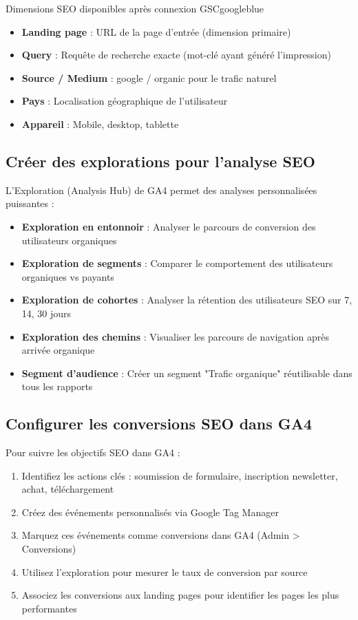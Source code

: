 \documentclass[12pt,a4paper,twoside]{report}
\begin{document}
\begin{mybox}{Dimensions SEO disponibles après connexion GSC}{googleblue}
\begin{itemize}
    \item \textbf{Landing page} : URL de la page d'entrée (dimension primaire)
    \item \textbf{Query} : Requête de recherche exacte (mot-clé ayant généré l'impression)
    \item \textbf{Source / Medium} : google / organic pour le trafic naturel
    \item \textbf{Pays} : Localisation géographique de l'utilisateur
    \item \textbf{Appareil} : Mobile, desktop, tablette
\end{itemize}
\end{mybox}

\subsection{Créer des explorations pour l'analyse SEO}

L'Exploration (Analysis Hub) de GA4 permet des analyses personnalisées puissantes :

\begin{itemize}
    \item \textbf{Exploration en entonnoir} : Analyser le parcours de conversion des utilisateurs organiques
    \item \textbf{Exploration de segments} : Comparer le comportement des utilisateurs organiques vs payants
    \item \textbf{Exploration de cohortes} : Analyser la rétention des utilisateurs SEO sur 7, 14, 30 jours
    \item \textbf{Exploration des chemins} : Visualiser les parcours de navigation après arrivée organique
    \item \textbf{Segment d'audience} : Créer un segment "Trafic organique" réutilisable dans tous les rapports
\end{itemize}

\subsection{Configurer les conversions SEO dans GA4}

Pour suivre les objectifs SEO dans GA4 :
\begin{enumerate}
    \item Identifiez les actions clés : soumission de formulaire, inscription newsletter, achat, téléchargement
    \item Créez des événements personnalisés via Google Tag Manager
    \item Marquez ces événements comme conversions dans GA4 (Admin > Conversions)
    \item Utilisez l'exploration pour mesurer le taux de conversion par source
    \item Associez les conversions aux landing pages pour identifier les pages les plus performantes
\end{enumerate}
\end{document}
